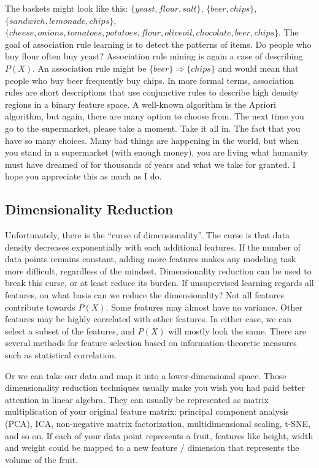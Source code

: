 \documentclass[
  10pt,
]{scrbook}
\begin{document}
The baskets might look like this: \(\{yeast, flour, salt\}\), \(\{beer, chips\}\), \(\{sandwich, lemonade, chips\}\), \(\{cheese, onions, tomatoes, potatoes, flour, olive oil, chocolate, beer, chips\}\).
The goal of association rule learning is to detect the patterns of items.
Do people who buy flour often buy yeast?
Association rule mining is again a case of describing \(P(X)\).
An association rule might be \(\{beer\} \Rightarrow \{chips\}\) and would mean that people who buy beer frequently buy chips.
In more formal terms, association rules are short descriptions that use conjunctive rules to describe high density regions in a binary feature space.
A well-known algorithm is the Apriori algorithm, but again, there are many option to choose from.
The next time you go to the supermarket, please take a moment.
Take it all in.
The fact that you have so many choices.
Many bad things are happening in the world, but when you stand in a supermarket (with enough money), you are living what humanity must have dreamed of for thousands of years and what we take for granted.
I hope you appreciate this as much as I do.

\hypertarget{dimensionality-reduction}{%
\subsection{Dimensionality Reduction}\label{dimensionality-reduction}}

Unfortunately, there is the ``curse of dimensionality''.
The curse is that data density decreases exponentially with each additional features.
If the number of data points remains constant, adding more features makes any modeling task more difficult, regardless of the mindset.
Dimensionality reduction can be used to break this curse, or at least reduce its burden.
If unsupervised learning regards all features, on what basis can we reduce the dimensionality?
Not all features contribute towards \(P(X)\).
Some features may almost have no variance.
Other features may be highly correlated with other features.
In either case, we can select a subset of the features, and \(P(X)\) will mostly look the same.
There are several methods for feature selection based on information-theoretic measures such as statistical correlation.

Or we can take our data and map it into a lower-dimensional space.
Those dimensionality reduction techniques usually make you wish you had paid better attention in linear algebra.
They can usually be represented as matrix multiplication of your original feature matrix: principal component analysis (PCA), ICA, non-negative matrix factorization, multidimensional scaling, t-SNE, and so on.
If each of your data point represents a fruit, features like height, width and weight could be mapped to a new feature / dimension that represents the volume of the fruit.
\end{document}
